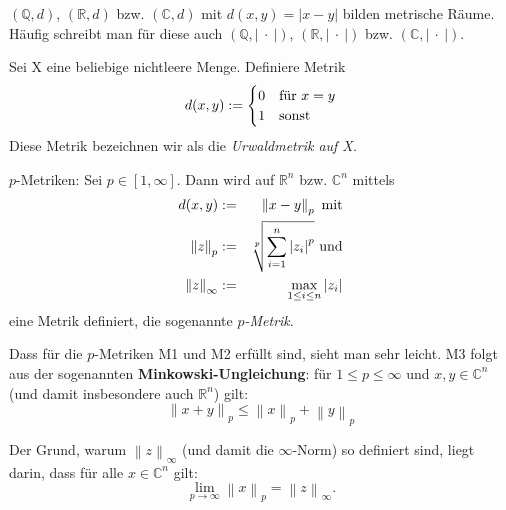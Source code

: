 \documentclass[10pt]{scrbook}
\begin{document}
\begin{Bsp}
$(\mathbb{Q}, d)$, $(\mathbb{R}, d)$ bzw. $(\mathbb{C}, d)$ mit $d(x, y)=\left|x-y\right|$ bilden metrische Räume. Häufig schreibt man für diese auch $(\mathbb{Q}, \left|\ \cdot\ \right|)$, $(\mathbb{R}, \left|\ \cdot\ \right|)$ bzw. $(\mathbb{C}, \left|\ \cdot\ \right|)$.
\end{Bsp}

\begin{Bsp} Sei X eine beliebige nichtleere Menge. Definiere Metrik
\begin{displaymath}
d(x, y) := 
\begin{cases}
0 & \textnormal{für } x=y \\
1 & \textnormal{sonst}
\end{cases}
\end{displaymath}
Diese Metrik bezeichnen wir als die \emph{Urwaldmetrik auf X.}
\end{Bsp}

\begin{Bsp}
\label{bsp:p-metriken}
$p$-Metriken: Sei $p\in\left[1, \infty\right]$. Dann wird auf $\mathbb{R}^n$ bzw. $\mathbb{C}^n$ mittels
\begin{eqnarray*}
d(x, y) & := & \left\|x-y\right\|_p \textnormal{ mit}\\
\left\|z\right\|_p & := & \sqrt[p]{\sum_{i=1}^n \left|z_i\right|^p}\textnormal{ und} \\
\left\|z\right\|_\infty & := &  \max_{1\leq i\leq n} \left|z_i\right|
\end{eqnarray*}
eine Metrik definiert, die sogenannte \emph{$p$-Metrik}.
\end{Bsp}

\begin{Bem}
Dass für die $p$-Metriken M1 und M2 erfüllt sind, sieht man sehr leicht. M3 folgt aus der sogenannten \textbf{Minkowski-Ungleichung}: für $1\leq p\leq\infty$ und $x, y\in \mathbb{C}^n$ (und damit insbesondere auch $\mathbb{R}^n$) gilt:
\begin{equation}
\left\|x+y\right\|_p\leq \left\|x\right\|_p+\left\|y\right\|_p
\end{equation}
\end{Bem}

\begin{Bem}
Der Grund, warum $\left\|z\right\|_\infty$ (und damit die $\infty$-Norm) so definiert sind, liegt darin, dass für alle $x\in \mathbb{C}^n$ gilt:
\begin{displaymath}
\lim_{p\rightarrow \infty} \left\|x\right\|_p = \left\|z\right\|_\infty.
\end{displaymath}
\end{Bem}
\end{document}
